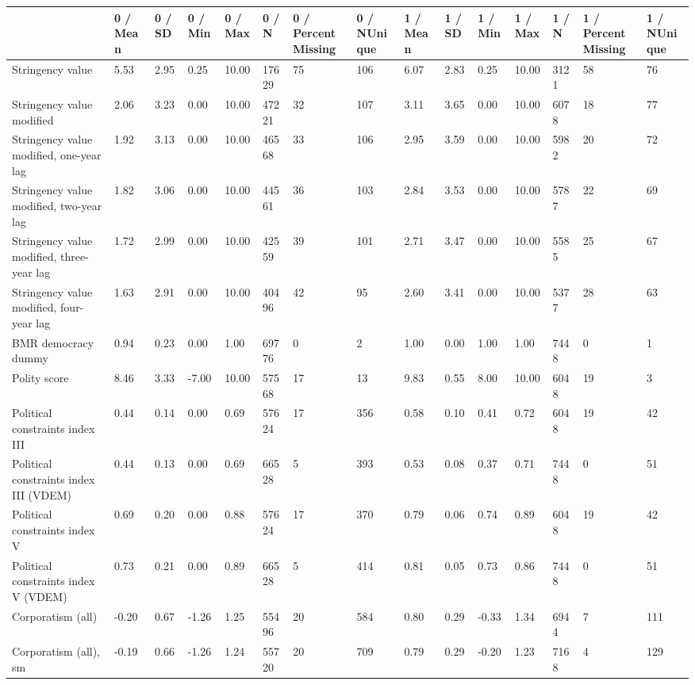 
\begin{longtable}{lllllllllllllll}
\toprule
  & 0 / Mean & 0 / SD & 0 / Min & 0 / Max & 0 / N & 0 / PercentMissing & 0 / NUnique & 1 / Mean & 1 / SD & 1 / Min & 1 / Max & 1 / N & 1 / PercentMissing & 1 / NUnique\\
\midrule
Stringency value & 5.53 & 2.95 & 0.25 & 10.00 & 17629 & 75 & 106 & 6.07 & 2.83 & 0.25 & 10.00 & 3121 & 58 & 76\\
Stringency value modified & 2.06 & 3.23 & 0.00 & 10.00 & 47221 & 32 & 107 & 3.11 & 3.65 & 0.00 & 10.00 & 6078 & 18 & 77\\
Stringency value modified, one-year lag & 1.92 & 3.13 & 0.00 & 10.00 & 46568 & 33 & 106 & 2.95 & 3.59 & 0.00 & 10.00 & 5982 & 20 & 72\\
Stringency value modified, two-year lag & 1.82 & 3.06 & 0.00 & 10.00 & 44561 & 36 & 103 & 2.84 & 3.53 & 0.00 & 10.00 & 5787 & 22 & 69\\
Stringency value modified, three-year lag & 1.72 & 2.99 & 0.00 & 10.00 & 42559 & 39 & 101 & 2.71 & 3.47 & 0.00 & 10.00 & 5585 & 25 & 67\\
\addlinespace
Stringency value modified, four-year lag & 1.63 & 2.91 & 0.00 & 10.00 & 40496 & 42 & 95 & 2.60 & 3.41 & 0.00 & 10.00 & 5377 & 28 & 63\\
BMR democracy dummy & 0.94 & 0.23 & 0.00 & 1.00 & 69776 & 0 & 2 & 1.00 & 0.00 & 1.00 & 1.00 & 7448 & 0 & 1\\
Polity score & 8.46 & 3.33 & -7.00 & 10.00 & 57568 & 17 & 13 & 9.83 & 0.55 & 8.00 & 10.00 & 6048 & 19 & 3\\
Political constraints index III & 0.44 & 0.14 & 0.00 & 0.69 & 57624 & 17 & 356 & 0.58 & 0.10 & 0.41 & 0.72 & 6048 & 19 & 42\\
Political constraints index III (VDEM) & 0.44 & 0.13 & 0.00 & 0.69 & 66528 & 5 & 393 & 0.53 & 0.08 & 0.37 & 0.71 & 7448 & 0 & 51\\
\addlinespace
Political constraints index V & 0.69 & 0.20 & 0.00 & 0.88 & 57624 & 17 & 370 & 0.79 & 0.06 & 0.74 & 0.89 & 6048 & 19 & 42\\
Political constraints index V (VDEM) & 0.73 & 0.21 & 0.00 & 0.89 & 66528 & 5 & 414 & 0.81 & 0.05 & 0.73 & 0.86 & 7448 & 0 & 51\\
Corporatism (all) & -0.20 & 0.67 & -1.26 & 1.25 & 55496 & 20 & 584 & 0.80 & 0.29 & -0.33 & 1.34 & 6944 & 7 & 111\\
Corporatism (all), sm & -0.19 & 0.66 & -1.26 & 1.24 & 55720 & 20 & 709 & 0.79 & 0.29 & -0.20 & 1.23 & 7168 & 4 & 129\\

\end{longtable}
